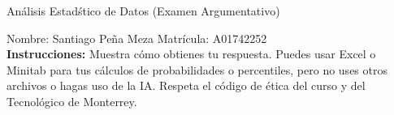\documentclass[8pt]{report}
\begin{document}
\newpage



\begin{center}
{An\'alisis Estad\'stico de Datos (Examen Argumentativo)}
\end{center}

Nombre: \underline{\hspace*{.2in}}
Santiago Peña Meza
\underline{\hspace*{.2in}} \quad Matr\'icula:\underline{\hspace*{.2in}}
A01742252
\underline{\hspace*{.2in}} \\

{\bf Instrucciones:} Muestra c\'omo obtienes tu respuesta. Puedes usar Excel 
o Minitab para tus cálculos de probabilidades o 
percentiles, pero no uses otros archivos o hagas uso de la IA. Respeta el 
c\'odigo de \'etica del curso y del Tecnol\'ogico 
de Monterrey.
\end{document}
